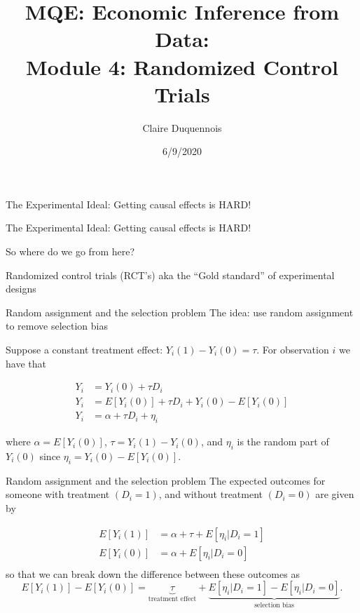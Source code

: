 \documentclass[
  ignorenonframetext,
]{beamer}
\title{MQE: Economic Inference from Data:\\
Module 4: Randomized Control Trials}
\author{Claire Duquennois}
\date{6/9/2020}
\begin{document}
\frame{\titlepage}

\begin{frame}{The Experimental Ideal:}
\protect\hypertarget{the-experimental-ideal}{}
Getting causal effects is HARD!
\end{frame}

\begin{frame}{The Experimental Ideal:}
\protect\hypertarget{the-experimental-ideal-1}{}
Getting causal effects is HARD!

So where do we go from here?

Randomized control trials (RCT's) aka the ``Gold standard'' of
experimental designs
\end{frame}

\begin{frame}{Random assignment and the selection problem}
\protect\hypertarget{random-assignment-and-the-selection-problem}{}
The idea: use random assignment to remove selection bias

Suppose a constant treatment effect: \(Y_i(1)-Y_i(0)=\tau\). For
observation \(i\) we have that

\[
\begin{split}
Y_i &=Y_i(0)+\tau D_i\\
Y_i &=E[Y_i(0)]+\tau D_i+Y_i(0)-E[Y_i(0)]\\
Y_i &=\alpha+\tau D_i+\eta_i
\end{split}
\]

where \(\alpha=E[Y_i(0)]\), \(\tau=Y_i(1)-Y_i(0)\), and \(\eta_i\) is
the random part of \(Y_i(0)\) since \(\eta_i=Y_i(0)-E[Y_i(0)]\).
\end{frame}

\begin{frame}{Random assignment and the selection problem}
\protect\hypertarget{random-assignment-and-the-selection-problem-1}{}
The expected outcomes for someone with treatment \((D_i=1)\), and
without treatment \((D_i=0)\) are given by

\[
\begin{split}
E[Y_i(1)] &=\alpha +\tau +E[\eta_i|D_i=1]\\
E[Y_i(0)] &=\alpha +E[\eta_i|D_i=0]\\
\end{split}
\] so that we can break down the difference between these outcomes as \[
E[Y_i(1)]-E[Y_i(0)] = 
    \underbrace{\tau}_\text{treatment effect} + \underbrace{E[\eta_i|D_i=1]-E[\eta_i|D_i=0]}_\text{selection bias}.
\]
\end{frame}
\end{document}
